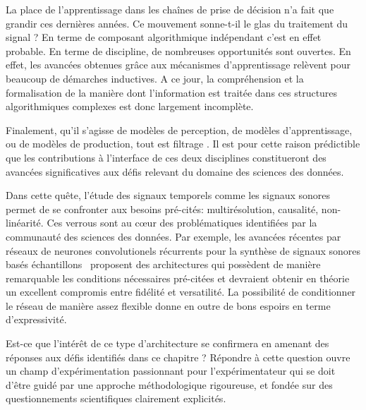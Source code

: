 La place de l'apprentissage dans les chaînes de prise de décision n'a fait que grandir ces dernières années. Ce mouvement sonne-t-il le glas du traitement du signal ? En terme de composant algorithmique indépendant c'est en effet probable. En terme de discipline, de nombreuses opportunités sont ouvertes. En effet, les avancées obtenues grâce aux mécanismes d'apprentissage relèvent pour beaucoup de démarches inductives. A ce jour, la compréhension et la formalisation de la manière dont l'information est traitée dans ces structures algorithmiques complexes est donc largement incomplète.

Finalement, qu'il s'agisse de modèles de perception, de modèles d'apprentissage, ou de modèles de production, \og tout est filtrage \fg. Il est pour cette raison prédictible que les contributions à l'interface de ces deux disciplines constitueront des avancées significatives aux défis relevant du domaine des sciences des données.~\cite{mallat2016understanding}

Dans cette quête, l'étude des signaux temporels comme les signaux sonores permet de se confronter aux besoins pré-cités: multirésolution, causalité, non-linéarité. Ces verrous sont au c\oe{}ur des problématiques identifiées par la communauté des sciences des données. Par exemple, les avancées récentes par réseaux de neurones convolutionels récurrents pour la synthèse de signaux sonores basés échantillons~\cite{wavenet} proposent des architectures qui possèdent de manière remarquable les conditions nécessaires pré-citées et devraient obtenir en théorie un excellent compromis entre fidélité et versatilité. La possibilité de conditionner le réseau de manière assez flexible donne en outre de bons espoirs en terme d'expressivité.

Est-ce que l'intérêt de ce type d'architecture se confirmera en amenant des réponses aux défis identifiés dans ce chapitre ? Répondre à cette question ouvre un champ d'expérimentation passionnant pour l'expérimentateur qui se doit d'être guidé par une approche méthodologique rigoureuse, et fondée sur des questionnements scientifiques clairement explicités.
